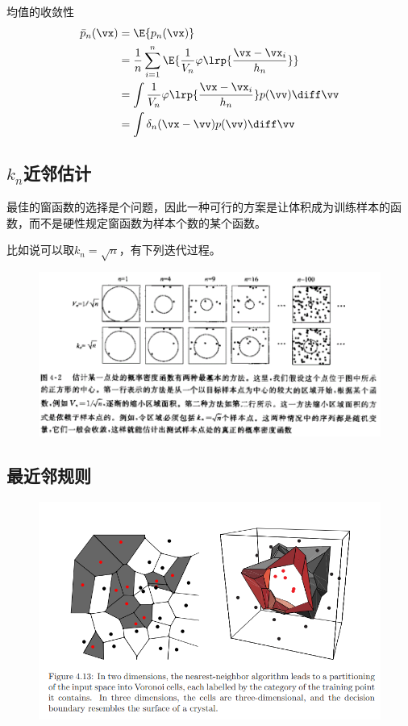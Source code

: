 均值的收敛性
\[\begin{aligned}
\bar{p}_n(\vx)&=\E{p_n(\vx)}\\
&=\frac{1}{n}\sum_{i=1}^n\E{\frac{1}{V_n}\varphi\lrp{\frac{\vx-\vx_i}{h_n}}}\\
&=\int\frac{1}{V_n}\varphi\lrp{\frac{\vx-\vx_i}{h_n}}p(\vv)\diff\vv\\
&=\int\delta_n(\vx-\vv)p(\vv)\diff\vv
\end{aligned}\]

\subsection{$k_n$近邻估计} %
最佳的窗函数的选择是个问题，因此一种可行的方案是让体积成为训练样本的函数，而不是硬性规定窗函数为样本个数的某个函数。

比如说可以取$k_n=\sqrt{n}$，有下列迭代过程。
\begin{figure}[H]
\centering
\includegraphics[width=0.8\linewidth]{fig/kn-neighbor.png}
\end{figure}

\subsection{最近邻规则} %
\begin{figure}[H]
\centering
\includegraphics[width=0.8\linewidth]{fig/nearest_neighbors.png}
\end{figure}


